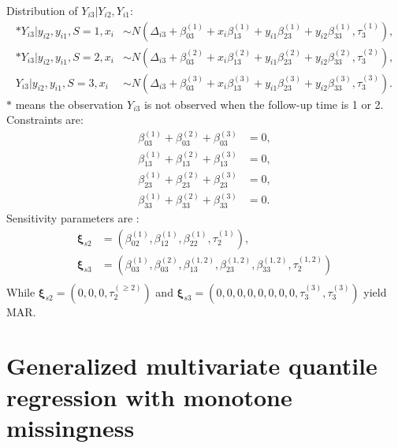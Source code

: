 \documentclass[12pt]{article}
\begin{document}
Distribution of $Y_{i3} | Y_{i2}, Y_{i1}$:
\begin{align}
  \label{eq:tri3}
  * Y_{i3} | y_{i2}, y_{i1} , S = 1, x_i & \sim N(\Delta_{i3} + \beta_{03}^{(1)} + x_i\beta_{13}^{(1)} + y_{i1}\beta_{23}^{(1)} + y_{i2}\beta_{33}^{(1)}, \tau_3^{(1)}),  \\
  * Y_{i3} | y_{i2}, y_{i1} , S = 2, x_i & \sim N(\Delta_{i3} + \beta_{03}^{(2)} + x_i\beta_{13}^{(2)} + y_{i1}\beta_{23}^{(2)} + y_{i2}\beta_{33}^{(2)}, \tau_3^{(2)}),  \\
  Y_{i3} | y_{i2}, y_{i1} , S = 3, x_i & \sim N(\Delta_{i3} + \beta_{03}^{(3)} +
  x_i\beta_{13}^{(3)} + y_{i1}\beta_{23}^{(3)} + y_{i2}\beta_{33}^{(3)}, \tau_3^{(3)}).
\end{align}
$*$ means the observation $Y_{i3}$ is not observed when the follow-up
time is 1 or 2. Constraints are:
\begin{align}
  \label{eq:constbi3}
  \beta_{03}^{(1)} + \beta_{03}^{(2)}  + \beta_{03}^{(3)}& = 0 , \\
  \beta_{13}^{(1)} + \beta_{13}^{(2)}  + \beta_{13}^{(3)}& = 0 , \\
  \beta_{23}^{(1)} + \beta_{23}^{(2)}  + \beta_{23}^{(3)}& = 0 , \\
  \beta_{33}^{(1)} + \beta_{33}^{(2)} + \beta_{33}^{(3)}& = 0 .
\end{align}
Sensitivity parameters are :
\begin{align*}
  \bm \xi_{s2} &= (\beta_{02}^{(1)}, \beta_{12}^{(1)}, \beta_{22}^{(1)}, \tau_2^{(1)}), \\
  \bm \xi_{s3} &= (\beta_{03}^{(1)},\beta_{03}^{(2)},  \beta_{13}^{(1,2)}, \beta_{23}^{(1, 2)}, \beta_{33}^{(1,2)}, \tau_2^{(1, 2)}) \\
\end{align*}
While $\bm \xi_{s2} = (0, 0, 0, \tau_2^{(\geq 2)})$ and $\bm \xi_{s3} = (0, 0, 0,
0, 0, 0, 0, 0, \tau_3^{(3)}, \tau_3^{(3)})$ yield MAR.
\section{Generalized multivariate quantile regression with monotone missingness }
\end{document}
